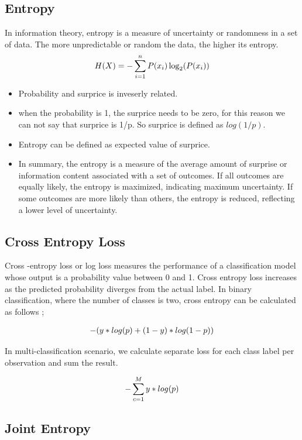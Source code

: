 \documentclass[10pt,a4paper]{article}
\begin{document}
	\subsection{Entropy}
	In information theory, entropy is a measure of uncertainty or randomness in a set of data. The more unpredictable or random the data, the higher its entropy.
	\begin{align*}
		\large H(X) = -\sum_{i=1}^{n} P(x_i) \log_2(P(x_i))
	\end{align*}
	\begin{itemize}
		\item Probability and surprice is inveserly related.
		\item when the probability is 1, the surprice needs to be zero, for this reason we can not say that surprice is 1/p. So surprice is defined as $log(1/p)$.
		\item Entropy can be defined as expected value of surprice.
		\item In summary, the entropy is a measure of the average amount of surprise or information content associated with a set of outcomes. If all outcomes are equally likely, the entropy is maximized, indicating maximum uncertainty. If some outcomes are more likely than others, the entropy is reduced, reflecting a lower level of uncertainty.
	\end{itemize}


	\subsection{Cross Entropy Loss}

	Cross -entropy loss or log loss measures the performance of a classification model whose output is a probability value between 0 and 1. Cross entropy loss increases as the predicted probability diverges from the actual label.
	In binary classification, where the number of classes is two, cross entropy can be calculated as follows ;

	\begin{align*}
		\large-(y*log(p) + (1-y) * log(1-p))\LARGE
	\end{align*}

	In multi-classification scenario, we calculate separate loss for each class label per observation and sum the result.

	\begin{align*}
		\large    -\sum_{c=1}^{M} y*log(p) \LARGE
	\end{align*}

	\subsection{Joint Entropy}
\end{document}
